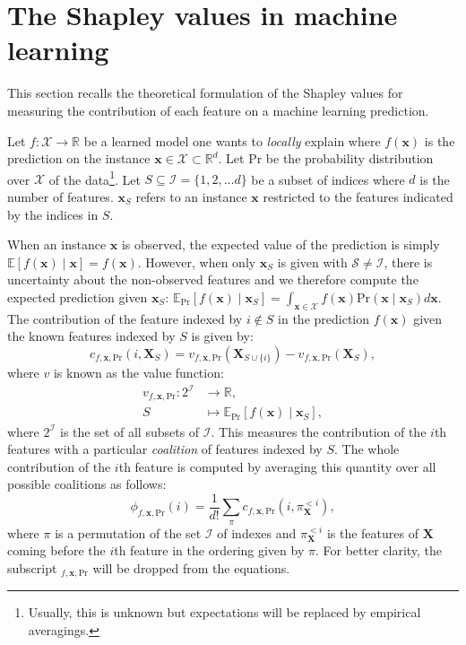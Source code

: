 \documentclass{article}
\theoremstyle{plain}
\theoremstyle{definition}
\theoremstyle{remark}
\begin{document}
\section{The Shapley values in machine learning}
\label{sec:shapley}

This section recalls the theoretical formulation of the Shapley values for measuring the contribution of each feature on a machine learning prediction.

Let $f:\mathcal{X}\to\mathbb{R}$ be a learned model one wants to \emph{locally} explain where $f(\bm{x})$ is the prediction on the instance $\bm{x}\in\mathcal{X}\subset\mathbb{R}^d$. Let $\text{Pr}$ be the probability distribution over $\mathcal{X}$ of the data\footnote{Usually, this is unknown but expectations will be replaced by empirical averagings.}. Let $S\subseteq \mathcal{I}=\{1,2,\dots d\}$ be a subset of indices where $d$ is the number of features. $\bm{x}_S$ refers to an instance $\bm{x}$ restricted to the features indicated by the indices in $S$.

When an instance $\bm{x}$ is observed, the expected value of the prediction is simply $\mathbb{E}[f(\bm{x}) \mid \bm{x}] = f(\bm{x})$. However, when only $\bm{x}_S$ is given with $\mathcal{S} \neq \mathcal{I}$, there is uncertainty about the non-observed features and we therefore compute the expected prediction given $\bm{x}_S$: $\mathbb{E}_{\text{Pr}}[f(\bm{x}) \mid \bm{x}_S] = \int_{\bm{x} \in \mathcal{X}}f(\bm{x})\text{Pr}(\bm{x} \mid \bm{x}_S)d\bm{x}$. The contribution of the feature indexed by $i \notin S$ in the prediction $f(\bm{x})$ given the known features indexed by $S$ is given by:
\begin{equation}
  \label{eq:contrib}
  c_{f,\bm{x},\text{Pr}}(i,\bm{X}_S) = v_{f,\bm{x},\text{Pr}}(\bm{X}_{S\cup\{i\}}) - v_{f,\bm{x},\text{Pr}}(\bm{X}_S),
\end{equation}
where $v$ is known as the value function:
\begin{equation}
  \label{eq:valuefunction}
  \begin{aligned}
    v_{f,\bm{x},\text{Pr}}: 2^{\mathcal{I}} &\to \mathbb{R},\\
    S &\mapsto \mathbb{E}_\text{Pr}[f(\bm{x})\mid \bm{x}_S],
  \end{aligned}
\end{equation}
where $2^{\mathcal{I}}$ is the set of all subsets of $\mathcal{I}$. This measures the contribution of the $i$th features with a particular \emph{coalition} of features indexed by $S$. The whole contribution of the $i$th feature is computed by averaging this quantity over all possible coalitions as follows:
\begin{equation}
  \phi_{f,\bm{x},\text{Pr}}(i) = \frac{1}{d!} \sum_{\pi}c_{f,\bm{x},\text{Pr}}(i,\pi^{<i}_{\bm{X}}),
\end{equation}
where $\pi$ is a permutation of the set $\mathcal{I}$ of indexes and $\pi^{<i}_{\bm{X}}$ is the features of $\bm{X}$ coming before the $i$th feature in the ordering given by $\pi$. For better clarity, the subscript $_{f,\bm{x},\text{Pr}}$ will be dropped from the equations.
\end{document}
